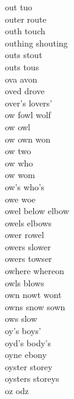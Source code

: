 out tuo\\
outer route\\
outh touch \\
outhing shouting \\
outs stout \\
outs tous\\
ova avon \\
oved drove \\
over's lovers' \\
ow fowl wolf  \\
ow owl \\
ow own won \\
ow two \\
ow who \\
ow wom \\
ow's who's \\
owe woe\\
owel below elbow \\
owels elbows \\
ower rowel \\
owers slower \\
owers towser \\
owhere whereon \\
owls blows \\
own nowt wont \\
owns snow sown\\
ows slow \\
oy's boys' \\
oyd's body's \\
oyne ebony \\
oyster storey\\
oysters storeys\\
oz odz \\

